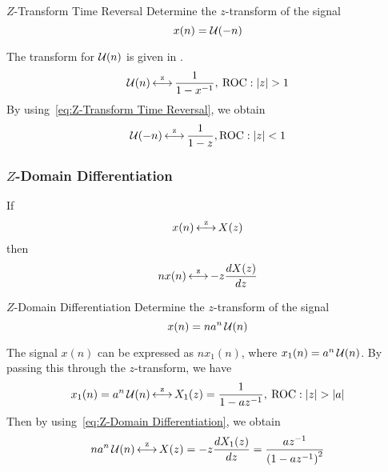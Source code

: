 \begin{example}[Example 3.2.6]{\texorpdfstring{$Z$-Transform}{Z-Transform} Time Reversal}
  Determine the $z$-transform of the signal
  \begin{equation*}
    x(n) = \operatorname{\mathcal{U}}(-n)
  \end{equation*}

  \tcblower

  The transform for $\operatorname{\mathcal{U}}(n)$ is given in .
  \begin{equation*}
    \operatorname{\mathcal{U}}(n) \operatorname{\overset{z}{\longleftrightarrow}} \frac{1}{1-x^{-1}}, \> \operatorname{\mathrm{ROC}}: \lvert z \rvert > 1
  \end{equation*}
  By using~\eqref{eq:Z-Transform Time Reversal}, we obtain
  \begin{equation*}
    \operatorname{\mathcal{U}}(-n) \operatorname{\overset{z}{\longleftrightarrow}} \frac{1}{1-z}, \operatorname{\mathrm{ROC}}: \lvert z \rvert < 1
  \end{equation*}
\end{example}

\subsubsection{\texorpdfstring{$Z$-Domain}{Z-Domain} Differentiation}\label{subsubsec:Z-Domain Differentiation}
If
\begin{equation*}
  x(n) \operatorname{\overset{z}{\longleftrightarrow}} X(z)
\end{equation*}
then
\begin{equation}\label{eq:Z-Domain Differentiation}
  nx(n) \operatorname{\overset{z}{\longleftrightarrow}} -z \frac{dX(z)}{dz}
\end{equation}

\begin{example}[Example 3.2.7]{\texorpdfstring{$Z$-Domain}{Z-Domain} Differentiation}
  Determine the $z$-transform of the signal
  \begin{equation*}
    x(n) = na^{n}\operatorname{\mathcal{U}}(n)
  \end{equation*}

  \tcblower

  The signal $x(n)$ can be expressed as $nx_{1}(n)$, where $x_{1}(n) = a^{n}\operatorname{\mathcal{U}}(n)$.
  By passing this through the $z$-transform, we have
  \begin{equation*}
    x_{1}(n) = a^{n}\operatorname{\mathcal{U}}(n) \operatorname{\overset{z}{\longleftrightarrow}} X_{1}(z) = \frac{1}{1-az^{-1}}, \> \operatorname{\mathrm{ROC}}: \lvert z \rvert > \lvert a \rvert
  \end{equation*}
  Then by using~\eqref{eq:Z-Domain Differentiation}, we obtain
  \begin{equation*}
    na^{n} \operatorname{\mathcal{U}}(n) \operatorname{\overset{z}{\longleftrightarrow}} X(z) = -z \frac{dX_{1}(z)}{dz} = \frac{az^{-1}}{{\left( 1-az^{-1}\right)}^{2}}
  \end{equation*}
\end{example}

